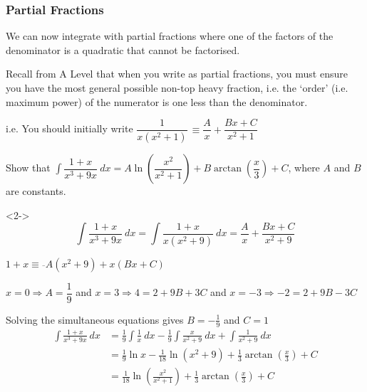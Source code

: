 \documentclass{beamer}
\begin{document}
	\begin{frame}[shrink=40]
		\frametitle{Partial Fractions}
		We can now integrate with partial fractions where one of the factors of the denominator is a quadratic that cannot be factorised.
		
		\alert{Recall from A Level that when you write as partial fractions, you must ensure you have the most general possible non-top heavy fraction, i.e. the ‘order’ (i.e. maximum power) of the numerator is one less than the denominator.}
		
		i.e. You should initially write $\dfrac{1}{x\left( x^{2}+1\right) }\dfrac{}{}\equiv \dfrac{A}{x}+\dfrac{Bx+C}{x^{2}+1}$
		
		\begin{problem}
			Show that $\int \dfrac{1+x}{x^{3}+9x}\ dx=A\ln \left( \dfrac{x^{2}}{x^{2}+1}\right) +B\arctan \left( \dfrac{x}{3}\right) +C$, where $A$ and $B$ are constants.
		\end{problem}
		\begin{solution}<2->
			\[ \int \dfrac{1+x}{x^{3}+9x}\ dx = \int \dfrac{1+x}{x(x^{2}+9)}\ dx = \dfrac{A}{x}+\dfrac{Bx+C}{x^{2}+9} \]
			
			$1+x\equiv \overline{}A\left( x^{2}+9\right) +x\left( Bx+C\right)$
			
			$x=0\Rightarrow A=\dfrac{1}{9}$ and $x=3\Rightarrow 4=2+9B+3C$ and $x=-3 \Rightarrow -2 = 2 +9B - 3C$
			
			Solving the simultaneous equations gives $B = -\frac{1}{9}$ and $C = 1$
			\begin{align*}
			\int \frac{1+x}{x^{3}+9x}\ dx &= \frac{1}{9} \int \frac{1}{x}\ dx - \frac{1}{9}\int\frac{x}{x^{2}+9}\ dx + \int \frac{1}{x^{2}+9}\ dx \\
			&= \frac{1}{9}\ln x-\frac{1}{18}\ln \left( x^{2}+9\right) +\frac{1}{3}\arctan \left( \frac{x}{3}\right) +C \\	
			&= \frac{1}{18}\ln \left( \frac{x^{2}}{x^{2}+1}\right) +\frac{1}{3}\arctan \left( \frac{x}{3}\right) +C \\
			\end{align*}
		\end{solution}
		
	\end{frame}
	
\end{document}
